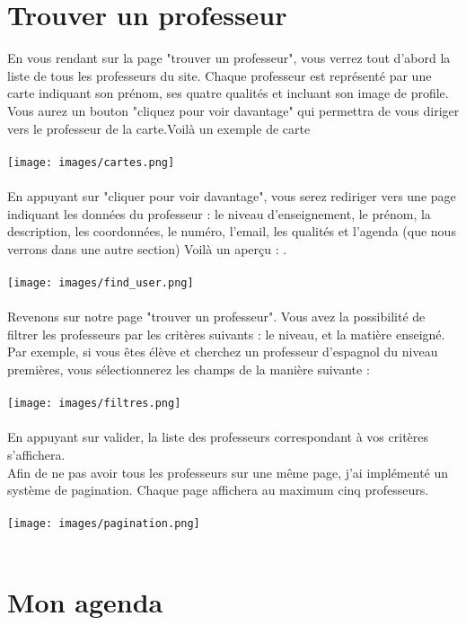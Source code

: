 \documentclass{article}%
\begin{document}
\section{Trouver un professeur}
En vous rendant sur la page "trouver un professeur", vous verrez tout d'abord la liste de tous les professeurs du site.  Chaque professeur est représenté par une carte indiquant son prénom, ses quatre qualités et incluant son image de profile. Vous aurez un bouton "cliquez pour voir davantage" qui permettra de vous diriger vers le professeur de la carte.Voilà un exemple de carte  \\\\
\texttt{[image: images/cartes.png]}
\\\\
En appuyant sur "cliquer pour voir davantage", vous serez rediriger vers une page indiquant les données du professeur : le niveau d'enseignement, le prénom, la description, les coordonnées, le numéro, l'email, les qualités et l'agenda (que nous verrons dans une autre section) Voilà un aperçu : .\\\\
\texttt{[image: images/find\_user.png]} \\\\\newpage
Revenons sur notre page "trouver un professeur". Vous avez la possibilité de filtrer les professeurs par les critères suivants : le niveau, et la matière enseigné. Par exemple, si vous êtes élève et cherchez un professeur d'espagnol du niveau premières, vous sélectionnerez les champs de la manière suivante : \\\\
\texttt{[image: images/filtres.png]} \\\\
En appuyant sur valider, la liste des professeurs correspondant à vos critères s'affichera. \\
Afin de ne pas avoir tous les professeurs sur une même page, j'ai implémenté un système de pagination. Chaque page affichera au maximum cinq professeurs.\\\\
\texttt{[image: images/pagination.png]} 
\\\\
\section{Mon agenda}
\end{document}
